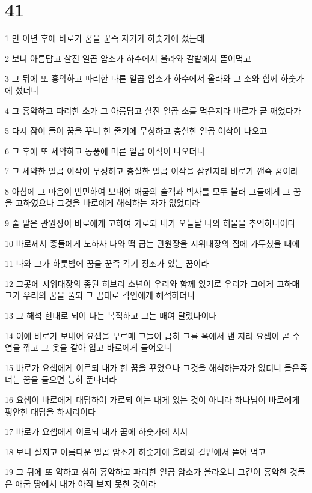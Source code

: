\chapter{41}

\par 1 만 이년 후에 바로가 꿈을 꾼즉 자기가 하숫가에 섰는데
\par 2 보니 아름답고 살진 일곱 암소가 하수에서 올라와 갈밭에서 뜯어먹고
\par 3 그 뒤에 또 흉악하고 파리한 다른 일곱 암소가 하수에서 올라와 그 소와 함께 하숫가에 섰더니
\par 4 그 흉악하고 파리한 소가 그 아름답고 살진 일곱 소를 먹은지라 바로가 곧 깨었다가
\par 5 다시 잠이 들어 꿈을 꾸니 한 줄기에 무성하고 충실한 일곱 이삭이 나오고
\par 6 그 후에 또 세약하고 동풍에 마른 일곱 이삭이 나오더니
\par 7 그 세약한 일곱 이삭이 무성하고 충실한 일곱 이삭을 삼킨지라 바로가 깬즉 꿈이라
\par 8 아침에 그 마음이 번민하여 보내어 애굽의 술객과 박사를 모두 불러 그들에게 그 꿈을 고하였으나 그것을 바로에게 해석하는 자가 없었더라
\par 9 술 맡은 관원장이 바로에게 고하여 가로되 내가 오늘날 나의 허물을 추억하나이다
\par 10 바로께서 종들에게 노하사 나와 떡 굽는 관원장을 시위대장의 집에 가두셨을 때에
\par 11 나와 그가 하룻밤에 꿈을 꾼즉 각기 징조가 있는 꿈이라
\par 12 그곳에 시위대장의 종된 히브리 소년이 우리와 함께 있기로 우리가 그에게 고하매 그가 우리의 꿈을 풀되 그 꿈대로 각인에게 해석하더니
\par 13 그 해석 한대로 되어 나는 복직하고 그는 매여 달렸나이다
\par 14 이에 바로가 보내어 요셉을 부르매 그들이 급히 그를 옥에서 낸 지라 요셉이 곧 수염을 깎고 그 옷을 갈아 입고 바로에게 들어오니
\par 15 바로가 요셉에게 이르되 내가 한 꿈을 꾸었으나 그것을 해석하는자가 없더니 들은즉 너는 꿈을 들으면 능히 푼다더라
\par 16 요셉이 바로에게 대답하여 가로되 이는 내게 있는 것이 아니라 하나님이 바로에게 평안한 대답을 하시리이다
\par 17 바로가 요셉에게 이르되 내가 꿈에 하숫가에 서서
\par 18 보니 살지고 아름다운 일곱 암소가 하숫가에 올라와 갈밭에서 뜯어 먹고
\par 19 그 뒤에 또 약하고 심히 흉악하고 파리한 일곱 암소가 올라오니 그같이 흉악한 것들은 애굽 땅에서 내가 아직 보지 못한 것이라
